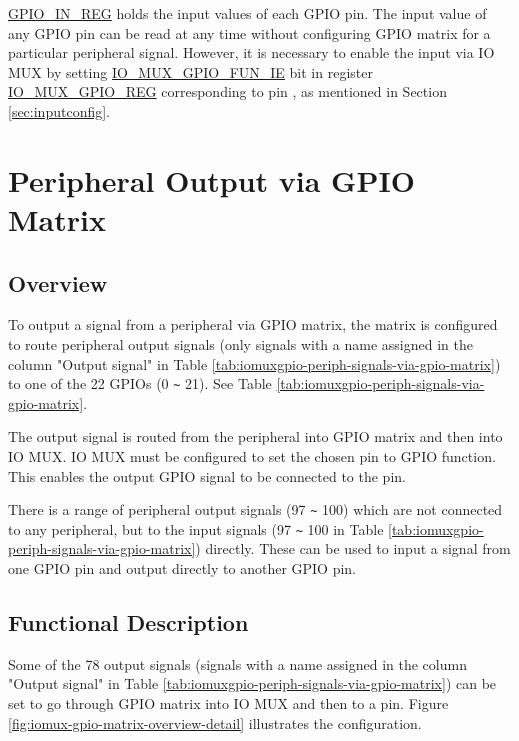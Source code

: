 \documentclass[main\_\_EN.tex]{subfiles}
\begin{document}
\hyperref[regdesc:GPIOINREG]{GPIO\_IN\_REG} holds the input values of each GPIO pin. The input value of any GPIO pin can be read at any time without configuring GPIO matrix for a particular peripheral signal. However, it is necessary to enable the input via IO MUX by setting \hyperref[fielddesc:IOMUXGPIONFUNIE]{IO\_MUX\_GPIO\_FUN\_IE} bit in register \hyperref[regdesc:IOMUXGPIONREG]{IO\_MUX\_GPIO\_REG} corresponding to pin , as mentioned in Section \ref{sec:inputconfig}.

\section{Peripheral Output via GPIO Matrix}\label{sec:peripheral-output-via-gpio-matrix}

\subsection{Overview}

To output a signal from a peripheral via GPIO matrix, the matrix is configured to route peripheral output signals (only signals with a name assigned in the column "Output signal" in Table \ref{tab:iomuxgpio-periph-signals-via-gpio-matrix}) to one of the 22 GPIOs (0 \verb+~+ 21). See Table \ref{tab:iomuxgpio-periph-signals-via-gpio-matrix}.

The output signal is routed from the peripheral into GPIO matrix and then into IO MUX. IO MUX must be configured to set the chosen pin to GPIO function. This enables the output GPIO signal to be connected to the pin.

\begin{tiplisting}
There is a range of peripheral output signals (97 \verb+~+ 100) which are not connected to any peripheral, but to the input signals (97 \verb+~+ 100 in Table \ref{tab:iomuxgpio-periph-signals-via-gpio-matrix}) directly. These can be used to input a signal from one GPIO pin and output directly to another GPIO pin.
\end{tiplisting}
\vspace{-2em}
\subsection{Functional Description}\label{IOMUXPeripheralOutput}

Some of the 78 output signals (signals with a name assigned in the column "Output signal" in Table \ref{tab:iomuxgpio-periph-signals-via-gpio-matrix}) can be set to go through GPIO matrix into IO MUX and then to a pin. Figure  \ref{fig:iomux-gpio-matrix-overview-detail} illustrates the configuration.
\end{document}
